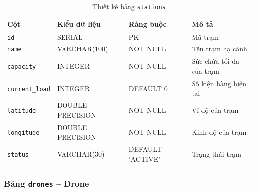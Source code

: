 \begin{table}[H]
\centering
\caption{Thiết kế bảng \texttt{stations}}
\begin{tabularx}{\textwidth}{|l|l|Z|Z|}
\hline
\textbf{Cột} &
\textbf{Kiểu dữ liệu} &
\textbf{Ràng buộc} &
\textbf{Mô tả} \\ \hline

\texttt{id}
& SERIAL
& PK
& Mã trạm \\ \hline

\texttt{name}
& VARCHAR(100)
& NOT NULL
& Tên trạm hạ cánh \\ \hline

\texttt{capacity}
& INTEGER
& NOT NULL
& Sức chứa tối đa của trạm \\ \hline

\texttt{current\_load}
& INTEGER
& DEFAULT 0
& Số kiện hàng hiện tại \\ \hline

\texttt{latitude}
& DOUBLE PRECISION
& NOT NULL
& Vĩ độ của trạm \\ \hline

\texttt{longitude}
& DOUBLE PRECISION
& NOT NULL
& Kinh độ của trạm \\ \hline

\texttt{status}
& VARCHAR(30)
& DEFAULT 'ACTIVE'
& Trạng thái trạm \\ \hline

\end{tabularx}
\end{table}



\subsubsection{Bảng \texttt{drones} -- Drone}

